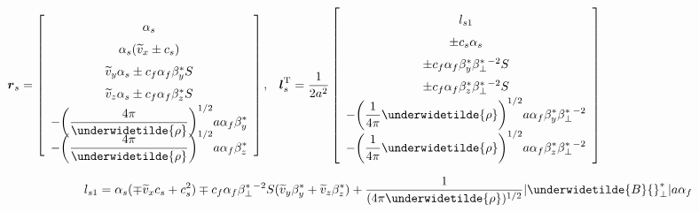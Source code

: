 \begin{center}
$\renewcommand{\arraystretch}{1.5}
\mbox{\boldmath $r$}_{s} =
\left[
\begin{array}{c}
\alpha_{s} \\
\alpha_{s} ( \widetilde{v}_{x} \pm c_{s} ) \\
\widetilde{v}_{y} \alpha_{s} \pm c_{f} \alpha_{f} \beta^{\ast}_{y} S  \\
\widetilde{v}_{z} \alpha_{s} \pm c_{f} \alpha_{f} \beta^{\ast}_{z} S  \\
\displaystyle
- \biggl( \frac{4 \pi}{\underwidetilde{\rho}} \biggr)^{1/2}
a \alpha_{f} \beta^{\ast}_{y} \vspace{-6pt} \\
\displaystyle
- \biggl( \frac{4 \pi}{\underwidetilde{\rho}} \biggr)^{1/2}
a \alpha_{f} \beta^{\ast}_{z} \vspace{-6pt} \\
\end{array}
\right]$, $\;$
$\renewcommand{\arraystretch}{1.5}
\displaystyle
\mbox{\boldmath $l$}_{s}^{\rm T} =
\frac{1}{2 a^2}
\left[
\begin{array}{c}
l_{s1} \\
\displaystyle
\pm c_s \alpha_s \\
\pm c_{f} \alpha_{f}
\beta^{\ast}_{y} \beta^{\ast}_{\bot} {}^{-2} S \\
\pm c_{f} \alpha_{f}
\beta^{\ast}_{z} \beta^{\ast}_{\bot} {}^{-2} S \\
\displaystyle
- \biggl( \frac1{4 \pi} {\underwidetilde{\rho}} \biggr)^{1/2}
a \alpha_{f} \beta_y^{\ast}
\beta^{\ast}_{\bot} {}^{-2} \\
\displaystyle
- \biggl( \frac1{4 \pi} {\underwidetilde{\rho}} \biggr)^{1/2}
a \alpha_{f} \beta_z^{\ast}
\beta^{\ast}_{\bot} {}^{-2} \\
\end{array}
\right]$ 
\end{center}

\begin{center}
\begin{equation}
\displaystyle
l_{s1} = \alpha_{s} ( \mp \widetilde{v}_{x} c_{s} + c_{s}^2 )
\mp c_{f} \alpha_{f} \beta^{\ast}_{\bot} {}^{-2} S 
(\widetilde{v}_{y} \beta_{y}^{\ast} + \widetilde{v}_{z} \beta_{z}^{\ast})
+ \frac1{(4 \pi \underwidetilde{\rho})^{1/2}} 
| \underwidetilde{B} {}^{\ast}_{\bot} | a \alpha_{f} \nonumber
\end{equation}
\end{center}

